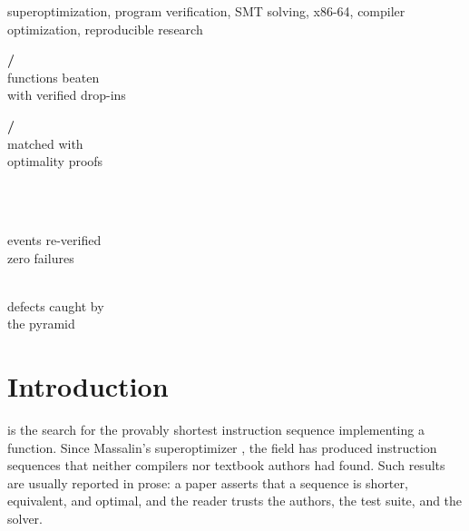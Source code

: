 \documentclass[journal,10pt]{IEEEtran}
\begin{document}
\begin{IEEEkeywords}
superoptimization, program verification, SMT solving, x86-64,
compiler optimization, reproducible research
\end{IEEEkeywords}

\begin{tcolorbox}[enhanced, colback=white, colframe=ink!20,
                  boxrule=0.5pt, arc=3pt, left=4pt, right=4pt,
                  top=6pt, bottom=6pt]
\begin{minipage}[t]{0.48\columnwidth}\centering
{\sffamily\bfseries\fontsize{17}{19}\selectfont\color{accent}%
\NumBeaten/\NumFunctions}\\[1pt]
{\sffamily\scriptsize\color{neutral}functions beaten\\with verified drop-ins}
\end{minipage}\hfill
\begin{minipage}[t]{0.48\columnwidth}\centering
{\sffamily\bfseries\fontsize{17}{19}\selectfont\color{steel}%
\NumMatched/\NumFunctions}\\[1pt]
{\sffamily\scriptsize\color{neutral}matched with\\optimality proofs}
\end{minipage}\\[5pt]
\begin{minipage}[t]{0.48\columnwidth}\centering
{\sffamily\bfseries\fontsize{17}{19}\selectfont\color{ink}%
\RecheckTotal}\\[1pt]
{\sffamily\scriptsize\color{neutral}events re-verified\\zero failures}
\end{minipage}\hfill
\begin{minipage}[t]{0.48\columnwidth}\centering
{\sffamily\bfseries\fontsize{17}{19}\selectfont\color{ochre}%
\NumLedgerRows}\\[1pt]
{\sffamily\scriptsize\color{neutral}defects caught by\\the pyramid}
\end{minipage}
\end{tcolorbox}

\vspace{1pt}

\section{Introduction}
 is the search for the provably
shortest instruction sequence implementing a function. Since
Massalin's superoptimizer \cite{massalin87}, the field has produced
instruction sequences that neither compilers nor textbook authors had
found. Such results are usually reported in prose: a paper asserts
that a sequence is shorter, equivalent, and optimal, and the reader
trusts the authors, the test suite, and the solver.
\end{document}
